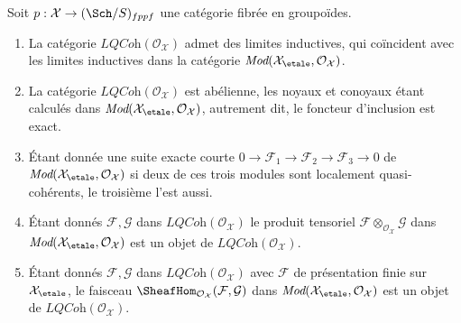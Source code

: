 \begin{lemma}
\label{lemma-lqc-colimits}
Soit $p : \mathcal{X} \to (\Sch/S)_{fppf}$ une catégorie fibrée en
groupoïdes.
\begin{enumerate}
\item La catégorie $\textit{LQCoh}(\mathcal{O}_\mathcal{X})$
admet des limites inductives, qui coïncident avec les limites inductives dans la catégorie
$\textit{Mod}(\mathcal{X}_\etale, \mathcal{O}_\mathcal{X})$.
\item La catégorie $\textit{LQCoh}(\mathcal{O}_\mathcal{X})$
est abélienne, les noyaux et conoyaux étant calculés dans
$\textit{Mod}(\mathcal{X}_\etale, \mathcal{O}_\mathcal{X})$,
autrement dit, le foncteur d'inclusion est exact.
\item Étant donnée une suite exacte courte
$0 \to \mathcal{F}_1 \to \mathcal{F}_2 \to \mathcal{F}_3 \to 0$ de
$\textit{Mod}(\mathcal{X}_\etale, \mathcal{O}_\mathcal{X})$
si deux de ces trois modules sont localement quasi-cohérents, le troisième l'est aussi.
\item Étant donnés $\mathcal{F}, \mathcal{G}$ dans
$\textit{LQCoh}(\mathcal{O}_\mathcal{X})$
le produit tensoriel $\mathcal{F} \otimes_{\mathcal{O}_\mathcal{X}} \mathcal{G}$
dans $\textit{Mod}(\mathcal{X}_\etale, \mathcal{O}_\mathcal{X})$
est un objet de $\textit{LQCoh}(\mathcal{O}_\mathcal{X})$.
\item Étant donnés $\mathcal{F}, \mathcal{G}$ dans
$\textit{LQCoh}(\mathcal{O}_\mathcal{X})$
avec $\mathcal{F}$ de présentation finie sur
$\mathcal{X}_\etale$, le faisceau
$\SheafHom_{\mathcal{O}_\mathcal{X}}(\mathcal{F}, \mathcal{G})$
dans $\textit{Mod}(\mathcal{X}_\etale, \mathcal{O}_\mathcal{X})$
est un objet de $\textit{LQCoh}(\mathcal{O}_\mathcal{X})$.
\end{enumerate}
\end{lemma}

